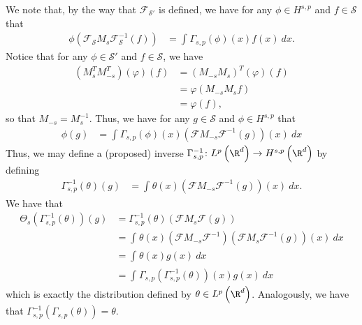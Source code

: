 \documentclass[10pt]{mypackage}
\begin{document}
\begin{solution}
  We note that, by the way that $ \mathcal{F}_{\mathscr{S}'} $ is defined, we have for any $\phi\in H^{s,p}$ and $f\in \mathscr{S}$ that
  \begin{align*}
    \phi\left( \mathcal{F}_{\mathscr{S}}M_s\mathcal{F}_{\mathscr{S}}^{-1}(f) \right) &= \int_{}^{} \Gamma_{s,p}\left(\phi\right)(x)f(x)\:dx.
  \end{align*}
  Notice that for any $\phi\in \mathcal{S}'$ and $f\in \mathscr{S}$, we have
  \begin{align*}
    \left( M_{s}^{T}M_{-s}^{T} \right)\left( \varphi \right)(f) &= \left( M_{-s}M_s \right)^{T}\left( \varphi \right)(f)\\
                                                                &= \varphi\left( M_{-s}M_sf \right)\\
                                                                &= \varphi\left( f \right),
  \end{align*}
  so that $M_{-s} = M_s^{-1}$. Thus, we have for any $g\in \mathscr{S}$ and $\phi\in H^{s,p}$ that
  \begin{align*}
    \phi(g) &= \int_{}^{} \Gamma_{s,p}\left( \phi \right)(x)\left( \mathcal{F}M_{-s}\mathcal{F}^{-1}(g) \right)(x)\:dx
  \end{align*}
  Thus, we may define a (proposed) inverse $\Gamma_{s,p}^{-1}\colon L^p\left( \R^d \right)\to H^{s,p}\left( \R^d \right)$ by defining
  \begin{align*}
    \Gamma_{s,p}^{-1}\left( \theta \right)\left( g \right) &= \int_{}^{} \theta(x) \left( \mathcal{F}M_{-s}\mathcal{F}^{-1}(g) \right)(x)\:dx.
  \end{align*}
  We have that
  \begin{align*}
    \Theta_s\left( \Gamma_{s,p}^{-1}\left( \theta \right) \right)\left( g \right) &= \Gamma_{s,p}^{-1}\left( \theta \right)\left( \mathcal{F}M_s\mathcal{F}(g) \right)\\
                                                &= \int_{}^{} \theta(x) \left( \mathcal{F}M_{-s}\mathcal{F}^{-1} \right)\left( \mathcal{F}M_s\mathcal{F}^{-1}(g) \right)(x)\:dx\\
                                                &= \int_{}^{} \theta(x)g(x)\:dx\\
                                                &= \int_{}^{} \Gamma_{s,p}\left( \Gamma_{s,p}^{-1}\left( \theta \right) \right)(x)g(x)\:dx
  \end{align*}
  which is exactly the distribution defined by $\theta\in L^p\left( \R^d \right)$. Analogously, we have that $\Gamma_{s,p}^{-1}\left( \Gamma_{s,p}(\theta) \right) = \theta$.
\end{solution}
\end{document}
